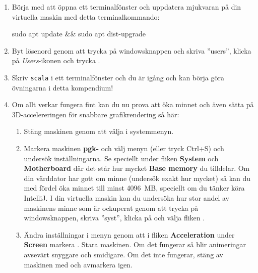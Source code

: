 \begin{enumerate}
\item Börja med att öppna ett terminalfönster och uppdatera mjukvaran på din virtuella maskin med detta terminalkommando:
\begin{REPLnonum}
sudo apt update && sudo apt dist-upgrade
\end{REPLnonum}

\item Byt lösenord genom att trycka på windowsknappen och skriva ''users'', klicka på \textit{Users}-ikonen och trycka .

\item Skriv \texttt{scala} i ett terminalfönster och du är igång och kan börja göra övningarna i detta kompendium!


\item Om allt verkar fungera fint kan du nu prova att öka minnet och även sätta på 3D-accelereringen för snabbare grafikrendering så här: 

\begin{enumerate}
\item Stäng maskinen genom att välja  i systemmenyn. 

\item Markera maskinen \textbf{pgk-\VMName} och välj menyn  (eller tryck Ctrl+S) och undersök inställningarna. Se speciellt under fliken \textbf{System} och \textbf{Motherboard} där det står hur mycket \textbf{Base memory} du tilldelar. Om din värddator har gott om minne (undersök exakt hur mycket) så kan du med fördel öka minnet till minst 4096~MB, speciellt om du tänker köra IntelliJ. I din virtuella maskin kan du undersöka hur stor andel av maskinens minne som är ockuperat genom att trycka på windowsknappen, skriva ''syst'', klicka på  och välja fliken .

\item Ändra inställningar i menyn  genom att i fliken \textbf{Acceleration} under \textbf{Screen} markera . Stara maskinen. Om det fungerar så blir animeringar avsevärt snyggare och smidigare. Om det inte fungerar, stäng av maskinen med  och avmarkera  igen.%


\end{enumerate}

\end{enumerate}